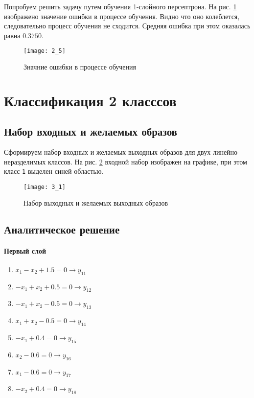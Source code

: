 Попробуем решить задачу путем обучения 1-слойного персептрона. На рис. \ref{fig:2_5} изображено значение ошибки в процессе обучения. Видно что оно колеблется, следовательно процесс обучения не сходится. Средняя ошибка при этом оказалась равна $0.3750$.

\begin{figure}[H]
\begin{center}
	\texttt{[image: 2\_5]}
	\caption{Значние ошибки в процессе обучения}
	\label{fig:2_5}
\end{center}
\end{figure}

\section{Классификация 2 класссов}

\subsection{Набор входных и желаемых образов}

Сформируем набор входных и желаемых выходных образов для двух линейно-неразделимых классов. На рис. \ref{fig:3_1} входной набор изображен на графике, при этом класс \verb+1+ выделен синей областью.

\begin{figure}[H]
\begin{center}
	\texttt{[image: 3\_1]}
	\caption{Набор выходных и желаемых выходных образов}
	\label{fig:3_1}
\end{center}
\end{figure}

\subsection{Аналитическое решение}


\paragraph{Первый слой}
\begin{enumerate}
	\item $x_1 - x_2 + 1.5 = 0 \rightarrow y_{11}$
	\item $-x_1 + x_2 + 0.5 = 0 \rightarrow y_{12}$
	\item $-x_1 + x_2 - 0.5 = 0 \rightarrow y_{13}$
	\item $x_1 + x_2 - 0.5 = 0 \rightarrow y_{14}$
	\item $-x_1 + 0.4 = 0 \rightarrow y_{15}$
	\item $x_2 - 0.6 = 0 \rightarrow y_{16}$
	\item $x_1 - 0.6 = 0 \rightarrow y_{17}$
	\item $-x_2 + 0.4 = 0 \rightarrow y_{18}$
\end{enumerate}

